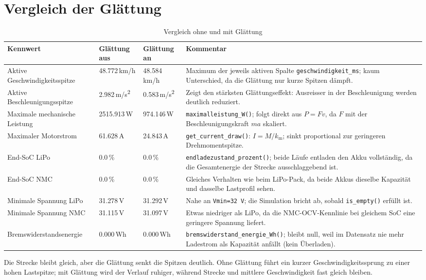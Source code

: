 \section{Vergleich der Glättung}

\begin{table}[htbp]
\centering
\caption{Vergleich ohne und mit Glättung}
\label{tab:vergleich-glaettung}
\begin{tabularx}{\textwidth}{@{}lXXX@{}}
\toprule
Kennwert & Glättung aus & Glättung an & Kommentar \\
\midrule
Aktive Geschwindigkeitsspitze & 48.772\,km/h & 48.584\,km/h & Maximum der jeweils aktiven Spalte \texttt{geschwindigkeit\_ms}; kaum Unterschied, da die Glättung nur kurze Spitzen dämpft. \\
Aktive Beschleunigungsspitze & 2.982\,m/s\textsuperscript{2} & 0.583\,m/s\textsuperscript{2} & Zeigt den stärksten Glättungseffekt: Ausreisser in der Beschleunigung werden deutlich reduziert. \\
Maximale mechanische Leistung & 2515.913\,W & 974.146\,W & \texttt{maximalleistung\_W()}; folgt direkt aus $P=Fv$, da $F$ mit der Beschleunigungskraft $m a$ skaliert. \\
Maximaler Motorstrom & 61.628\,A & 24.843\,A & \texttt{get\_current\_draw()}: $I = M/k_{\mathrm{m}}$; sinkt proportional zur geringeren Drehmomentspitze. \\
End-SoC LiPo & 0.0\,\% & 0.0\,\% & \texttt{endladezustand\_prozent()}; beide Läufe entladen den Akku vollständig, da die Gesamtenergie der Strecke ausschlaggebend ist. \\
End-SoC NMC & 0.0\,\% & 0.0\,\% & Gleiches Verhalten wie beim LiPo-Pack, da beide Akkus dieselbe Kapazität und dasselbe Lastprofil sehen. \\
Minimale Spannung LiPo & 31.278\,V & 31.292\,V & Nahe an \texttt{Vmin=32\,V}; die Simulation bricht ab, sobald \texttt{is\_empty()} erfüllt ist. \\
Minimale Spannung NMC & 31.115\,V & 31.097\,V & Etwas niedriger als LiPo, da die NMC-OCV-Kennlinie bei gleichem SoC eine geringere Spannung liefert. \\
Bremswiderstandsenergie & 0.000\,Wh & 0.000\,Wh & \texttt{bremswiderstand\_energie\_Wh()}; bleibt null, weil im Datensatz nie mehr Ladestrom als Kapazität anfällt (kein Überladen). \\
\bottomrule
\end{tabularx}
\end{table}

Die Strecke bleibt gleich, aber die Glättung senkt die Spitzen deutlich. Ohne Glättung führt ein kurzer Geschwindigkeitssprung zu einer hohen Lastspitze; mit Glättung wird der Verlauf ruhiger, während Strecke und mittlere Geschwindigkeit fast gleich bleiben.

